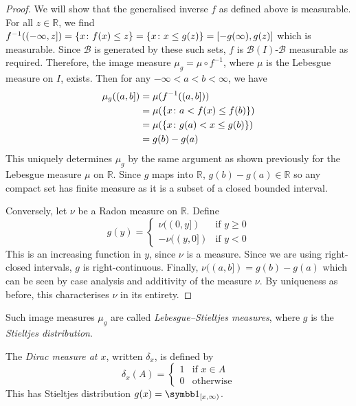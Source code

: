\begin{proof}
	We will show that the generalised inverse \( f \) as defined above is measurable.
	For all \( z \in \mathbb R \), we find \( f^{-1}((-\infty,z]) = \qty{x \colon f(x) \leq z} = \qty{x \colon x \leq g(z)} = [-g(\infty),g(z)] \) which is measurable.
	Since \( \mathcal B \) is generated by these such sets, \( f \) is \( \mathcal B(I) \)-\(\mathcal B \) measurable as required.
	Therefore, the image measure \( \mu_g = \mu \circ f^{-1} \), where \( \mu \) is the Lebesgue measure on \( I \), exists.
	Then for any \( -\infty < a < b < \infty \), we have
	\begin{align*}
		\mu_g((a,b]) &= \mu(f^{-1}((a,b])) \\
		&= \mu(\qty{x \colon a < f(x) \leq f(b)}) \\
		&= \mu(\qty{x \colon g(a) < x \leq g(b)}) \\
		&= g(b) - g(a)
	\end{align*}
	This uniquely determines \( \mu_g \) by the same argument as shown previously for the Lebesgue measure \( \mu \) on \( \mathbb R \).
	Since \( g \) maps into \( \mathbb R \), \( g(b) - g(a) \in \mathbb R \) so any compact set has finite measure as it is a subset of a closed bounded interval.

	Conversely, let \( \nu \) be a Radon measure on \( \mathbb R \).
	Define
	\[ g(y) = \begin{cases}
		\nu((0,y]) & \text{if } y \geq 0 \\
		-\nu((y,0]) & \text{if } y < 0
	\end{cases} \]
	This is an increasing function in \( y \), since \( \nu \) is a measure.
	Since we are using right-closed intervals, \( g \) is right-continuous.
	Finally, \( \nu((a,b]) = g(b) - g(a) \) which can be seen by case analysis and additivity of the measure \( \nu \).
	By uniqueness as before, this characterises \( \nu \) in its entirety.
\end{proof}
\begin{remark}
	Such image measures \( \mu_g \) are called \emph{Lebesgue--Stieltjes measures}, where \( g \) is the \emph{Stieltjes distribution}.
\end{remark}
\begin{example}
	The \emph{Dirac measure at \( x \)}, written \( \delta_x \), is defined by
	\[ \delta_x(A) = \begin{cases}
		1 & \text{if } x \in A \\
		0 & \text{otherwise}
	\end{cases} \]
	This has Stieltjes distribution \( g(x) = \symbb 1_{[x,\infty)} \).
\end{example}

